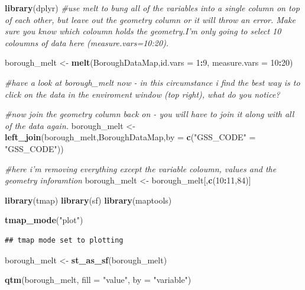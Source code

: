 \documentclass[]{book}
\newenvironment{Shaded}{\begin{snugshade}}{\end{snugshade}}
\newcommand{\CommentTok}[1]{\textcolor[rgb]{0.56,0.35,0.01}{\textit{#1}}}
\newcommand{\DataTypeTok}[1]{\textcolor[rgb]{0.13,0.29,0.53}{#1}}
\newcommand{\DecValTok}[1]{\textcolor[rgb]{0.00,0.00,0.81}{#1}}
\newcommand{\KeywordTok}[1]{\textcolor[rgb]{0.13,0.29,0.53}{\textbf{#1}}}
\newcommand{\NormalTok}[1]{#1}
\newcommand{\OperatorTok}[1]{\textcolor[rgb]{0.81,0.36,0.00}{\textbf{#1}}}
\newcommand{\StringTok}[1]{\textcolor[rgb]{0.31,0.60,0.02}{#1}}
\begin{document}
\begin{Shaded}
\begin{Highlighting}[]
\KeywordTok{library}\NormalTok{(dplyr)}
\CommentTok{#use melt to bung all of the variables into a single column on top of each other, but leave out the geometry column or it will throw an error. Make sure you know which coloumn holds the geometry.I'm only going to select 10 coloumns of data here (measure.vars=10:20).}

\NormalTok{borough_melt <-}\StringTok{ }\KeywordTok{melt}\NormalTok{(BoroughDataMap,}\DataTypeTok{id.vars =} \DecValTok{1}\OperatorTok{:}\DecValTok{9}\NormalTok{, }\DataTypeTok{measure.vars =} \DecValTok{10}\OperatorTok{:}\DecValTok{20}\NormalTok{)}

\CommentTok{#have a look at borough_melt now - in this circumstance i find the best way is to click on the data in the enviroment window (top right), what do you notice?}

\CommentTok{#now join the geometry column back on - you will have to join it along with all of the data again.}
\NormalTok{borough_melt <-}\StringTok{ }\KeywordTok{left_join}\NormalTok{(borough_melt,BoroughDataMap,}\DataTypeTok{by =} \KeywordTok{c}\NormalTok{(}\StringTok{"GSS_CODE"}\NormalTok{ =}\StringTok{ "GSS_CODE"}\NormalTok{))}

\CommentTok{#here i'm removing everything except the variable coloumn, values and the geometry inforamtion}
\NormalTok{borough_melt <-}\StringTok{ }\NormalTok{borough_melt[,}\KeywordTok{c}\NormalTok{(}\DecValTok{10}\OperatorTok{:}\DecValTok{11}\NormalTok{,}\DecValTok{84}\NormalTok{)]}

\KeywordTok{library}\NormalTok{(tmap)}
\KeywordTok{library}\NormalTok{(sf)}
\KeywordTok{library}\NormalTok{(maptools)}

\KeywordTok{tmap_mode}\NormalTok{(}\StringTok{"plot"}\NormalTok{)}
\end{Highlighting}
\end{Shaded}

\begin{verbatim}
## tmap mode set to plotting
\end{verbatim}

\begin{Shaded}
\begin{Highlighting}[]
\NormalTok{borough_melt <-}\StringTok{ }\KeywordTok{st_as_sf}\NormalTok{(borough_melt)}

\KeywordTok{qtm}\NormalTok{(borough_melt, }\DataTypeTok{fill =} \StringTok{"value"}\NormalTok{, }\DataTypeTok{by =} \StringTok{"variable"}\NormalTok{)}
\end{Highlighting}
\end{Shaded}
\end{document}
